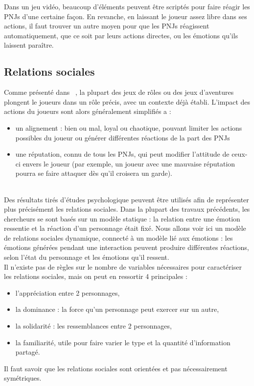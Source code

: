 \documentclass[asi]{picINSA}
\begin{document}
Dans un jeu vidéo, beaucoup d'éléments peuvent être scriptés pour faire réagir les PNJs d'une certaine façon. En revanche, en laissant le joueur assez libre dans ses actions, il faut trouver un autre moyen pour que les PNJs réagissent automatiquement, que ce soit par leurs actions directes, ou les émotions qu'ils laissent paraître.\\

\subsection{Relations sociales}

Comme présenté dans ~\cite{IRIS:conf/aiide/OchsSC2008}, la plupart des jeux de rôles ou des jeux d'aventures plongent le joueurs dans un rôle précis, avec un contexte déjà établi. L'impact des actions du joueurs sont alors généralement simplifiés a :

\begin{itemize}
\item un alignement : bien ou mal, loyal ou chaotique, pouvant limiter
  les actions possibles du joueur ou générer différentes réactions de
  la part des PNJs

\item une réputation, connu de tous les PNJs, qui peut modifier
  l'attitude de ceux-ci envers le joueur (par exemple, un joueur avec
  une mauvaise réputation pourra se faire attaquer dès qu'il croisera
  un garde).
\end{itemize}

~\\
Des résultats tirés d'études psychologique peuvent être utilisés afin de représenter plus précisément les relations sociales. Dans la plupart des travaux précédents, les chercheurs se sont basés sur un modèle statique : la relation entre une émotion ressentie et la réaction d'un personnage était fixé. Nous allons voir ici un modèle de relations sociales dynamique, connecté à un modèle lié aux émotions : les émotions générées pendant une interaction peuvent produire différentes réactions, selon l'état du personnage et les émotions qu'il ressent.\\

Il n'existe pas de règles sur le nombre de variables nécessaires pour caractériser les relations sociales, mais on peut en ressortir 4 principales :
\begin{itemize}
\item l'appréciation entre 2 personnages,
\item la dominance : la force qu'un personnage peut exercer sur un autre,
\item la solidarité : les ressemblances entre 2 personnages,
\item la familiarité, utile pour faire varier le type et la quantité d'information partagé.
\end{itemize}
Il faut savoir que les relations sociales sont orientées et pas nécessairement symétriques.\\
\end{document}
